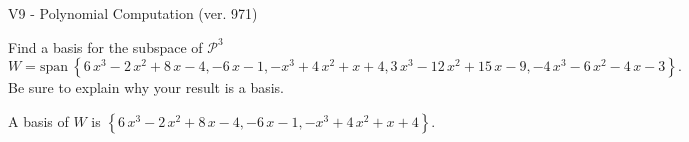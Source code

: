 \begin{exercise}
  \begin{exerciseTitle}V9 - Polynomial Computation (ver. 971)\end{exerciseTitle}
  \begin{exerciseStatement}
    Find a basis for the subspace of \(\mathcal{P}^3\) 
\[W=\mathrm{span}\ \left\{6 \, x^{3} - 2 \, x^{2} + 8 \, x - 4 , -6 \, x - 1 , -x^{3} + 4 \, x^{2} + x + 4 , 3 \, x^{3} - 12 \, x^{2} + 15 \, x - 9 , -4 \, x^{3} - 6 \, x^{2} - 4 \, x - 3\right\}.\]
 Be sure to explain why your result is a basis.


  \end{exerciseStatement}
  \begin{exerciseAnswer}
   A basis of \(W\) is  \(\left\{6 \, x^{3} - 2 \, x^{2} + 8 \, x - 4 , -6 \, x - 1 , -x^{3} + 4 \, x^{2} + x + 4\right\}\).
  


  \end{exerciseAnswer}
\end{exercise}
